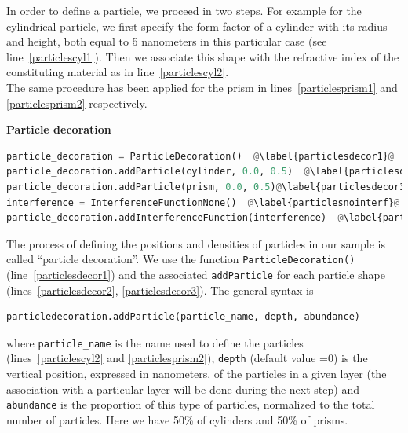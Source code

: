 \noindent In order to define a particle, we proceed in two steps. For example for
the cylindrical particle, we first specify the form factor of a cylinder with 
its radius and height, both equal to 5 nanometers in this particular
case (see line~\ref{particlescyl1}). Then we associate this shape with
the refractive index of the constituting material as in line~\ref{particlescyl2}.\\

\noindent The same procedure has been applied for the prism in lines~\ref{particlesprism1} and \ref{particlesprism2} respectively.

\noindent \textbf{Particle decoration} \\

\begin{lstlisting}[language=python, style=eclipseboxed, name=ex1,nolol]
particle_decoration = ParticleDecoration()  @\label{particlesdecor1}@
particle_decoration.addParticle(cylinder, 0.0, 0.5)  @\label{particlesdecor2}@
particle_decoration.addParticle(prism, 0.0, 0.5)@\label{particlesdecor3}@
interference = InterferenceFunctionNone()  @\label{particlesnointerf}@
particle_decoration.addInterferenceFunction(interference)  @\label{particlesinterf}@
\end{lstlisting}

\noindent The process of defining the positions and densities of particles
in our sample is called ``particle decoration''. We use the function \texttt{ParticleDecoration()}
(line~\ref{particlesdecor1}) and  the associated \texttt{addParticle}
for each particle shape (lines~\ref{particlesdecor2}, \ref{particlesdecor3}). The general
syntax is 

\begin{lstlisting}[language=python, style=eclipse,numbers=none]
particledecoration.addParticle(particle_name, depth, abundance) 
\end{lstlisting}

\noindent  where \texttt{particle\_name} is the name used to define the particles
(lines~\ref{particlescyl2} and \ref{particlesprism2}), \texttt{depth}
(default value =0)
is the vertical position, expressed in nanometers, of the particles in a given layer (the
association with a particular layer will be done during the next step) and
\texttt{abundance} is the proportion of this type of particles, 
normalized to the total number of particles. Here we have 50\% of cylinders
and 50\% of prisms. \\ 

